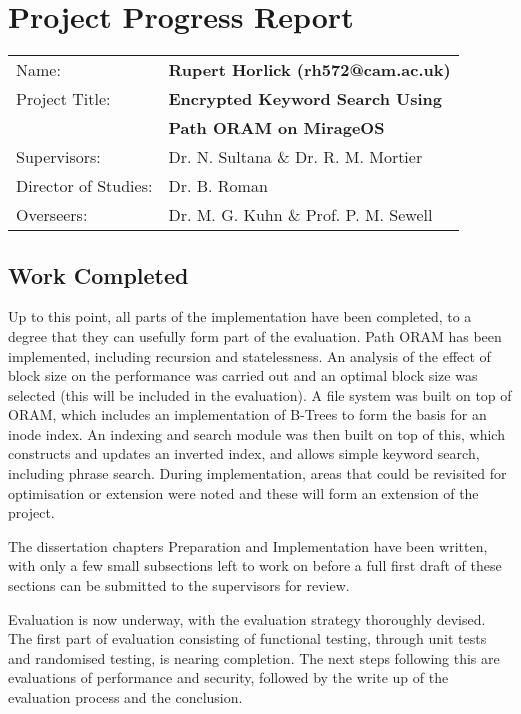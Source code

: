 \documentclass[11pt,a4paper]{article}
\begin{document}
\section*{Project Progress Report}

\vskip 20pt

{\large
\begin{tabular}{ll}
Name:               & \bf Rupert Horlick (rh572@cam.ac.uk) \\
Project Title:      & \bf Encrypted Keyword Search Using \\
& \bf Path ORAM on MirageOS \\
Supervisors:         & Dr. N. Sultana \& Dr. R. M. Mortier \\ 
Director of Studies: & Dr. B. Roman \\
Overseers: & Dr. M. G. Kuhn \& Prof. P. M. Sewell
\end{tabular}
}

\vskip 20pt

\subsection*{Work Completed}

Up to this point, all parts of the implementation have been completed, to a degree that they can usefully form part of the evaluation. Path ORAM has been implemented, including recursion and statelessness. An analysis of the effect of block size on the performance was carried out and an optimal block size was selected (this will be included in the evaluation). A file system was built on top of ORAM, which includes an implementation of B-Trees to form the basis for an inode index. An indexing and search module was then built on top of this, which constructs and updates an inverted index, and allows simple keyword search, including phrase search. During implementation, areas that could be revisited for optimisation or extension were noted and these will form an extension of the project.

The dissertation chapters Preparation and Implementation have been written, with only a few small subsections left to work on before a full first draft of these sections can be submitted to the supervisors for review.

Evaluation is now underway, with the evaluation strategy thoroughly devised. The first part of evaluation consisting of functional testing, through unit tests and randomised testing, is nearing completion. The next steps following this are evaluations of performance and security, followed by the write up of the evaluation process and the conclusion.
\end{document}
